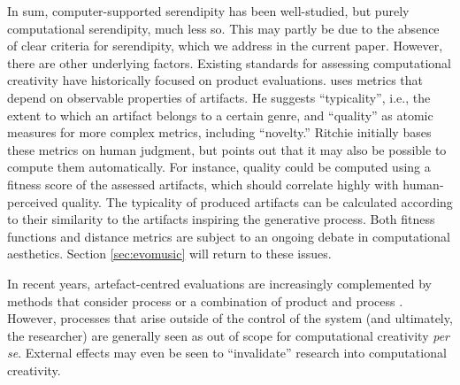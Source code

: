In sum, computer-supported serendipity has been well-studied, but
purely computational serendipity, much less so.  This may partly be
due to the absence of clear criteria for serendipity, which we address
in the current paper.  However, there are other underlying factors.
Existing standards for assessing computational creativity have
historically focused on product evaluations.
 uses metrics that depend on observable properties of artifacts.  He suggests ``typicality'', i.e., the extent to which an artifact belongs to a certain genre, and ``quality'' as atomic measures for more complex metrics, including ``novelty.'' Ritchie initially bases these metrics on human judgment, but points out that it may also be possible to compute them automatically. For instance, quality could be computed using a fitness score of the assessed artifacts, which should correlate highly with human-perceived quality. The typicality of produced artifacts can be calculated according to their similarity to the artifacts inspiring the generative process. Both fitness functions and distance metrics are subject to an ongoing debate in computational aesthetics.  Section \ref{sec:evomusic} will return to these issues.

In recent years, artefact-centred evaluations are increasingly complemented by methods
that consider process \cite{colton2008creativity,colton-assessingprogress} or a combination
of product and process \cite{jordanous:12}.  However, processes that
arise outside of the control of the system (and ultimately, the
researcher) are generally seen as out of scope for computational
creativity \emph{per se}.  External effects may even be seen to
``invalidate'' research into computational creativity.
%

